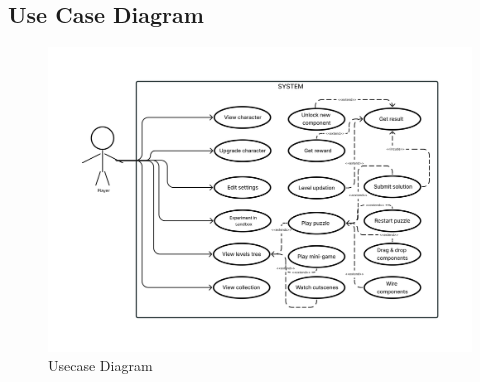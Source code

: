\documentclass[../main.tex]{subfiles}
\begin{document}
\subsection{Use Case Diagram}
\vfill
\begin{figure}[!ht]
\centering
\includegraphics[scale=0.27]{images/chapter3/Usecase.png}
\caption{Usecase Diagram}
\label{Use Case.png}
\end{figure}
\vfill
\newpage
\end{document}
